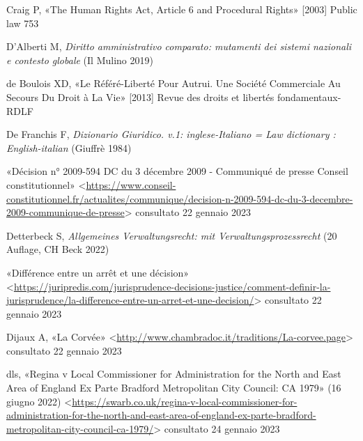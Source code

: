 \documentclass[12pt,it,a4paper,]{report}
\newlength{\cslhangindent}
\newenvironment{CSLReferences}[2] %
 {%
  \setlength{\parindent}{0pt}
  \ifodd #1 \everypar{\setlength{\hangindent}{\cslhangindent}}\ignorespaces\fi
  \ifnum #2 > 0
  \setlength{\parskip}{#2\baselineskip}
  \fi
 }%
 {}
\begin{document}
\begin{CSLReferences}{0}{0}
\leavevmode{}%
Craig P, {«The Human Rights Act, Article 6 and Procedural Rights»}
{[}2003{]} Public law 753

\leavevmode{}%
D'Alberti M, \emph{Diritto amministrativo comparato: mutamenti dei
sistemi nazionali e contesto globale} ({Il Mulino} 2019)

\leavevmode{}%
de Boulois XD, {«Le Référé-Liberté Pour Autrui. {Une} Société
Commerciale Au Secours Du Droit à La Vie»} {[}2013{]} Revue des droits
et libertés fondamentaux-RDLF

\leavevmode{}%
De Franchis F, \emph{Dizionario Giuridico. v.1: inglese-Italiano = Law
dictionary : English-italian} ({Giuffrè} 1984)

\leavevmode{}%
{«Décision n° 2009-594 DC du 3 décembre 2009 - Communiqué de presse
\textbar{} Conseil constitutionnel»}
\textless{}\url{https://www.conseil-constitutionnel.fr/actualites/communique/decision-n-2009-594-dc-du-3-decembre-2009-communique-de-presse}\textgreater{}
consultato 22 gennaio 2023

\leavevmode{}%
Detterbeck S, \emph{Allgemeines Verwaltungsrecht: mit
Verwaltungsprozessrecht} (20 Auflage, {CH Beck} 2022)

\leavevmode{}%
{«Différence entre un arrêt et une décision»}
\textless{}\url{https://juripredis.com/jurisprudence-decisions-justice/comment-definir-la-jurisprudence/la-difference-entre-un-arret-et-une-decision/}\textgreater{}
consultato 22 gennaio 2023

\leavevmode{}%
Dijaux A, {«La Corvée»}
\textless{}\url{http://www.chambradoc.it/traditions/La-corvee.page}\textgreater{}
consultato 22 gennaio 2023

\leavevmode{}%
dls, {«Regina v {Local Commissioner} for {Administration} for the
{North} and {East Area} of {England} Ex Parte {Bradford Metropolitan
City Council}: {CA} 1979»} (16 giugno 2022)
\textless{}\url{https://swarb.co.uk/regina-v-local-commissioner-for-administration-for-the-north-and-east-area-of-england-ex-parte-bradford-metropolitan-city-council-ca-1979/}\textgreater{}
consultato 24 gennaio 2023


\end{CSLReferences}
\end{document}
